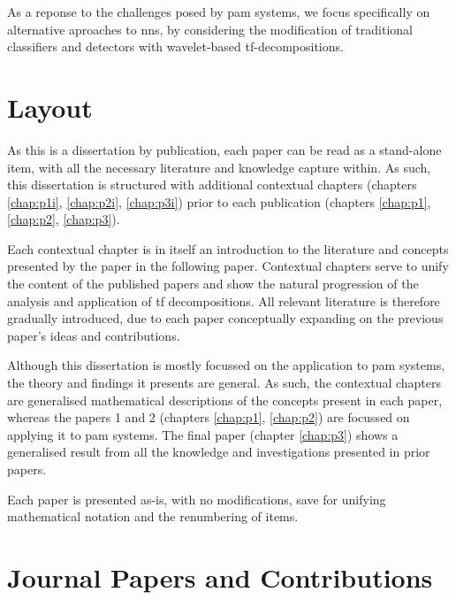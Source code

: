 As a reponse to the challenges posed by \ac{pam} systems, we focus specifically on alternative aproaches to \acp{nn}, by considering the modification of traditional classifiers and detectors with wavelet-based \ac{tf}-decompositions.

\section{Layout}

As this is a dissertation by publication, each paper can be read as a stand-alone item, with all the necessary literature and knowledge capture within. As such, this dissertation is structured with additional contextual chapters (chapters \ref*{chap:p1i}, \ref*{chap:p2i}, \ref*{chap:p3i}) prior to each publication (chapters \ref*{chap:p1}, \ref*{chap:p2}, \ref*{chap:p3}).

Each contextual chapter is in itself an introduction to the literature and concepts presented by the paper in the following paper. Contextual chapters serve to unify the content of the published papers and show the natural progression of the analysis and application of \ac{tf} decompositions. All relevant literature is therefore gradually introduced, due to each paper conceptually expanding on the previous paper's ideas and contributions.

Although this dissertation is mostly focussed on the application to \ac{pam} systems, the theory and findings it presents are general. As such, the contextual chapters are generalised mathematical descriptions of the concepts present in each paper, whereas the papers 1 and 2 (chapters \ref*{chap:p1}, \ref*{chap:p2}) are focussed on applying it to \ac{pam} systems. The final paper (chapter \ref*{chap:p3}) shows a generalised result from all the knowledge and investigations presented in prior papers.

Each paper is presented as-is, with no modifications, save for unifying mathematical notation and the renumbering of items.


\section{Journal Papers and Contributions}